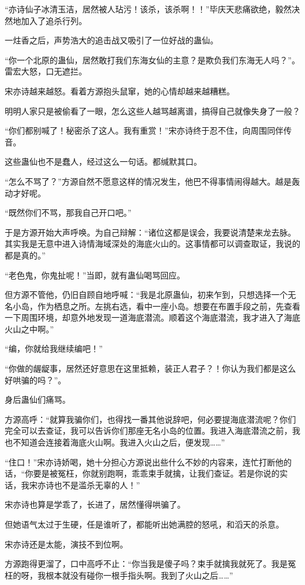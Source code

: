 \begin{this_body}
“亦诗仙子冰清玉洁，居然被人玷污！该杀，该杀啊！！”毕庆天悲痛欲绝，毅然决然地加入了追杀行列。

一炷香之后，声势浩大的追击战又吸引了一位好战的蛊仙。

“你一个北原的蛊仙，居然敢打我们东海女仙的主意？是欺负我们东海无人吗？”。雷宏大怒，口无遮拦。

宋亦诗越来越怒。看着方源抱头鼠窜，她的心情却越来越糟糕。

明明人家只是被偷看了一眼，怎么这些人越骂越离谱，搞得自己就像失身了一般？

“你们都别喊了！秘密杀了这人。我有重赏！”宋亦诗终于忍不住，向周围同伴传音。

这些蛊仙也不是蠢人，经过这么一句话。都缄默其口。

“怎么不骂了？”方源自然不愿意这样的情况发生，他巴不得事情闹得越大。越是轰动才好呢。

“既然你们不骂，那我自己开口吧。”

于是方源开始大声呼唤。为自己辩解：“诸位这都是误会，我要说清楚来龙去脉。其实我是无意中进入诗情海域深处的海底火山的。这事情都可以调查取证，我说的都是真的。”

“老色鬼，你鬼扯呢！”当即，就有蛊仙喝骂回应。

但方源不管他，仍旧自顾自地呼喊：“我是北原蛊仙，初来乍到，只想选择一个无名小岛，作为栖息之所。左挑右选，看中一座小岛。想要在布置手段之前，先查看一下周围环境，却意外地发现一道海底潜流。顺着这个海底潜流，我才进入了海底火山之中啊。”

“编，你就给我继续编吧！”

“你做的龌龊事，居然还好意思在这里抵赖，装正人君子？！你认为我们都是这么好哄骗的吗？”。

身后蛊仙们痛骂。

方源高呼：“就算我骗你们，也得找一番其他说辞吧，何必要提海底潜流呢？你们完全可以去查证，我可以告诉你们那座无名小岛的位置。我进入海底潜流之前，我也不知道会连接着海底火山啊。我进入火山之后，便发现……”

“住口！”宋亦诗娇喝，她十分担心方源说出些什么不妙的内容来，连忙打断他的话，“你要是被冤枉，你就别跑啊，乖乖束手就擒，让我们查证。若是你说的实话，我宋亦诗也不是滥杀无辜的人！”

宋亦诗也算是学乖了，长进了，居然懂得哄骗了。

但她语气太过于生硬，任是谁听了，都能听出她满腔的怒吼，和滔天的杀意。

宋亦诗还是太能，演技不到位啊。

方源跑得更溜了，口中高呼不止：“你当我是傻子吗？束手就擒我就死了。我是冤枉的呀，我根本就没有碰你一根手指头啊。我到了火山之后……”


\end{this_body}
